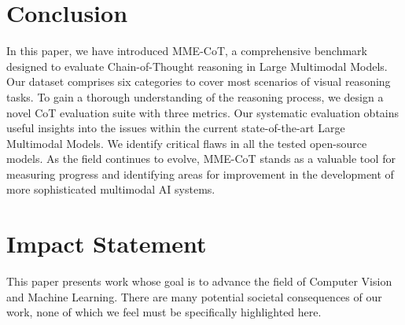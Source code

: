 
\section{Conclusion}
In this paper, we have introduced MME-CoT, a comprehensive benchmark designed to evaluate Chain-of-Thought reasoning in Large Multimodal Models. 
Our dataset comprises six categories to cover most scenarios of visual reasoning tasks.
To gain a thorough understanding of the reasoning process, we design a novel CoT evaluation suite with three metrics. 
Our systematic evaluation obtains useful insights into the issues within the current state-of-the-art Large Multimodal Models.
We identify critical flaws in all the tested open-source models.
As the field continues to evolve, MME-CoT stands as a valuable tool for measuring progress and identifying areas for improvement in the development of more sophisticated multimodal AI systems.

\section*{Impact Statement}
This paper presents work whose goal is to advance the field
of Computer Vision and Machine Learning. There are many
potential societal consequences of our work, none of which
we feel must be specifically highlighted here.
